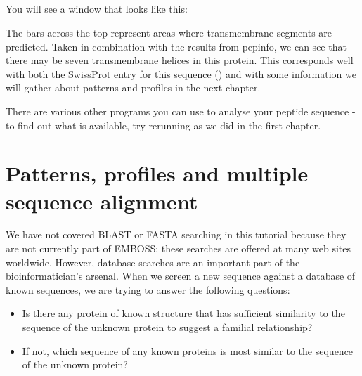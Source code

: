 \documentclass[12pt]{report}
\begin{document}
\unix{}\\
\\
\\
\\

You will see a window that looks like this:

\begin{figure}[H]
\begin{center}
\end{center}
\label{fig:tmap}
\end{figure}

The bars across the top represent areas where transmembrane segments
are predicted. Taken in combination with the results from pepinfo, we
can see that there may be seven transmembrane helices in this
protein. This corresponds well with both the SwissProt entry for this
sequence () and with some information we will gather
about patterns and profiles in the next chapter.

There are various other programs you can use to analyse your peptide
sequence - to find out what is available, try rerunning
 as we did in the first chapter.

\chapter{Patterns, profiles and multiple sequence alignment}
We have not covered BLAST or FASTA searching in this tutorial because
they are not currently part of EMBOSS; these searches are offered at
many web sites worldwide. However, database searches are an important
part of the bioinformatician's arsenal. When we screen a new sequence
against a database of known sequences, we are trying to answer the
following questions:

\begin{itemize}
\item Is there any protein of known structure that
has sufficient similarity to the sequence of the unknown protein to
suggest a familial relationship? 
\item If not, which sequence of any known proteins is most similar 
to the sequence of the unknown protein?
\end{itemize}
\end{document}
